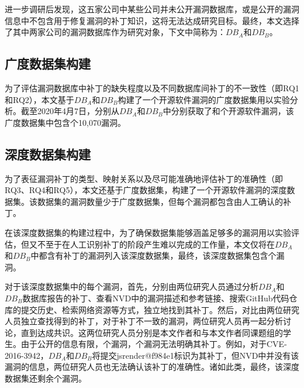 进一步调研后发现，这五家公司中某些公司并未公开漏洞数据库，或是公开的漏洞信息中不包含用于修复漏洞的补丁知识，这将无法达成研究目标。最终，本文选择了其中两家公司的漏洞数据库作为研究对象，下文中简称为：$DB_A$和$DB_B$。


\subsection{广度数据集构建}
为了评估漏洞数据库中补丁的缺失程度以及不同数据库间补丁的不一致性（即RQ1和RQ2），本文基于$DB_A$和$DB_B$构建了一个开源软件漏洞的广度数据集用以实验分析。截至2020年4月7日，分别从$DB_A$和$DB_B$中分别获取了和个开源软件漏洞，该广度数据集中包含个10,070漏洞。

\subsection{深度数据集构建}
为了表征漏洞补丁的类型、映射关系以及尽可能准确地评估补丁的准确性（即RQ3、RQ4和RQ5），本文还基于广度数据集，构建了一个开源软件漏洞的深度数据集。该数据集的漏洞数量少于广度数据集，但每个漏洞都包含由人工确认的补丁。%

在该深度数据集的构建过程中，为了确保数据集能够涵盖足够多的漏洞用以实验评估，但又不至于在人工识别补丁的阶段产生难以完成的工作量，本文仅将在$DB_A$和$DB_B$中都含有补丁的漏洞列入该深度数据集，最终，该深度数据集包含个漏洞。

对于该深度数据集中的每个漏洞，首先，分别由两位研究人员通过分析$DB_A$和$DB_B$数据库报告的补丁、查看NVD中的漏洞描述和参考链接、搜索GitHub代码仓库的提交历史、检索网络资源等方式，独立地找到其补丁。然后，对比由两位研究人员独立查找得到的补丁，对于补丁不一致的漏洞，两位研究人员再一起分析讨论，直到达成共识。这两位研究人员分别是本文作者和与本文作者同课题组的学生。由于公开的信息有限，个漏洞，个漏洞无法明确其补丁。例如，对于CVE-2016-3942，$DB_A$和$DB_B$将提交jsrender@f984e1\cite{jsrender}标识为其补丁，但NVD中并没有该漏洞的信息，两位研究人员也无法确认该补丁的准确性。诸如此类，最终，该深度数据集还剩余个漏洞。

